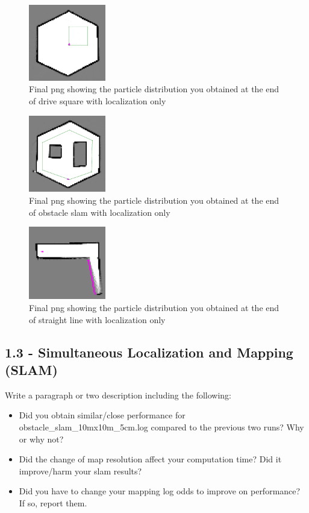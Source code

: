 \documentclass[journal,twocolumn]{IEEEtran}
\begin{document}
\begin{figure}[H]
\centering
\includegraphics[width=0.3\textwidth]{Media/1221.png}
\caption{Final png showing the particle distribution you obtained at the end of drive square with localization only}
\end{figure}

\begin{figure}[H]
\centering
\includegraphics[width=0.3\textwidth]{Media/1222.png}
\caption{Final png showing the particle distribution you obtained at the end of obstacle slam with localization only}
\end{figure}


\begin{figure}[H]
\centering
\includegraphics[width=0.3\textwidth]{Media/1223.png}
\caption{Final png showing the particle distribution you obtained at the end of straight line with localization only}
\end{figure}

\subsection*{1.3 - Simultaneous Localization and Mapping (SLAM)} 

 Write a paragraph or two description including the following:
 \begin{itemize}
    \item Did you obtain similar/close performance for obstacle\_slam\_10mx10m\_5cm.log compared to the previous two runs? Why or why not?
    \item Did the change of map resolution affect your computation time? Did it improve/harm your slam results?
    \item Did you have to change your mapping log odds to improve on performance? If so, report them.
\end{itemize}
\end{document}

